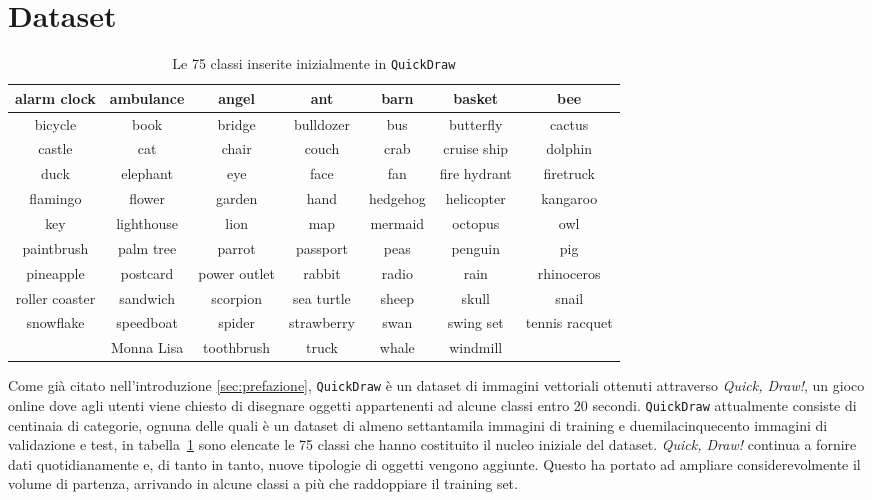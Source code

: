 \section{Dataset}
\label{sec:dataset}
\begin{table}[ht]\tiny
\centering
	\begin{tabular}{| c | c | c | c | c | c | c |}
		\hline
		alarm clock & ambulance & angel & ant & barn & basket & bee \\
		\hline
		bicycle & book & bridge & bulldozer & bus & butterfly & cactus \\
		\hline
		castle & cat & chair & couch & crab & cruise ship & dolphin \\
		\hline
		duck & elephant & eye & face & fan & fire hydrant & firetruck \\
		\hline
		flamingo & flower & garden & hand & hedgehog & helicopter & kangaroo \\
		\hline
		key & lighthouse & lion & map & mermaid & octopus & owl \\
		\hline
		paintbrush & palm tree & parrot & passport & peas & penguin & pig \\
		\hline
		pineapple & postcard & power outlet & rabbit & radio & rain & rhinoceros \\
		\hline
		roller coaster & sandwich & scorpion & sea turtle & sheep & skull & snail \\
		\hline
		snowflake & speedboat & spider & strawberry & swan & swing set & tennis racquet \\
		\hline
		& Monna Lisa & toothbrush & truck & whale & windmill & \\
		\hline
	\end{tabular}
	\caption{Le 75 classi inserite inizialmente in \texttt{QuickDraw}}
	\label{tab:1}
\end{table}
Come già citato nell'introduzione \ref{sec:prefazione}, \texttt{QuickDraw} è un dataset di immagini vettoriali ottenuti attraverso \textit{Quick, Draw!}\cite{quickdraw}, un gioco online dove agli utenti viene chiesto di disegnare oggetti appartenenti ad alcune classi entro 20 secondi. \texttt{QuickDraw} attualmente consiste di centinaia di categorie, ognuna delle quali è un dataset di almeno settantamila immagini di training e duemilacinquecento immagini di validazione e test, in tabella~\ref{tab:1} sono elencate le 75 classi che hanno costituito il nucleo iniziale del dataset. \textit{Quick, Draw!} continua a fornire dati quotidianamente e, di tanto in tanto, nuove tipologie di oggetti vengono aggiunte. Questo ha portato ad ampliare considerevolmente il volume di partenza, arrivando in alcune classi a più che raddoppiare il training set.

